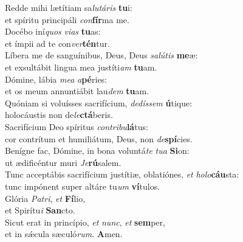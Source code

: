 \oddverse Redde mihi lætítiam sa\textit{lu}\textit{tá}\textit{ris} \textbf{tu}i:~\*\\
\oddverse et spíritu principáli \textit{con}\textbf{fír}ma me.\\
\evenverse Docébo iní\textit{quos} \textit{vi}\textit{as} \textbf{tu}as:~\*\\
\evenverse et ímpii ad te con\textit{ver}\textbf{tén}tur.\\
\oddverse Líbera me de sanguínibus, Deus, Deus \textit{sa}\textit{lú}\textit{tis} \textbf{me}æ:~\*\\
\oddverse et exsultábit lingua mea justíti\textit{am} \textbf{tu}am.\\
\evenverse Dómine, lábia \textit{me}\textit{a} \textit{a}\textbf{pé}ries:~\*\\
\evenverse et os meum annuntiábit lau\textit{dem} \textbf{tu}am.\\
\oddverse Quóniam si voluísses sacrifícium, \textit{de}\textit{dís}\textit{sem} \textbf{ú}tique:~\*\\
\oddverse holocáustis non de\textit{le}\textbf{ctá}beris.\\
\evenverse Sacrifícium Deo spíritus \textit{con}\textit{tri}\textit{bu}\textbf{lá}tus:~\*\\
\evenverse cor contrítum et humiliátum, Deus, non \textit{de}\textbf{spí}cies.\\
\oddverse Benígne fac, Dómine, in bona voluntá\textit{te} \textit{tu}\textit{a} \textbf{Si}on:~\*\\
\oddverse ut ædificéntur muri \textit{Je}\textbf{rú}salem.\\
\evenverse Tunc acceptábis sacrifícium justítiæ, oblatiónes, \textit{et} \textit{ho}\textit{lo}\textbf{cáu}sta:~\*\\
\evenverse tunc impónent super altáre tu\textit{um} \textbf{ví}tulos.\\
\oddverse Glória \textit{Pa}\textit{tri}, \textit{et} \textbf{Fí}lio,~\*\\
\oddverse et Spirítu\textit{i} \textbf{San}cto.\\
\evenverse Sicut erat in princípio, \textit{et} \textit{nunc}, \textit{et} \textbf{sem}per,~\*\\
\evenverse et in sǽcula sæculó\textit{rum}. \textbf{A}men.\\
